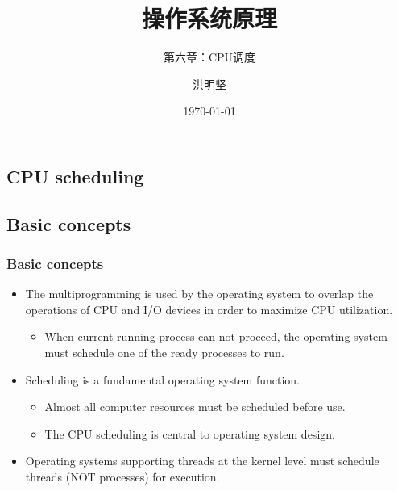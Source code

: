 \documentclass[CJKutf8,xcolor=pdftex,dvipsnames,table]{beamer}
\begin{document}
\begin{CJK*}{UTF8}{song}

  \title{ 操作系统原理}
  \subtitle{ 第六章：CPU调度}
	\author{ 洪明坚}


  \date{\today}
  \frame{\titlepage}


  \section{CPU scheduling}

  \subsection{Basic concepts}
  
  \begin{frame}
  \frametitle{Basic concepts} \pause
  \begin{itemize}
  \item{The multiprogramming is used by the operating system to overlap the operations of CPU and I/O devices in order to maximize CPU utilization.} \pause
    \begin{itemize}
    \item{When current running process can not proceed, the operating system must schedule one of the ready processes to run.} \pause
    \end{itemize}
  \item{Scheduling is a fundamental operating system function.} \pause
    \begin{itemize}
    \item{Almost all computer resources must be scheduled before use.} \pause
    \item{The CPU scheduling is central to operating system design.} \pause
    \end{itemize}
  \item{Operating systems supporting threads at the kernel level must schedule threads (NOT processes) for execution.} 
  \end{itemize}
  \end{frame}
  

\end{CJK*}
\end{document}
